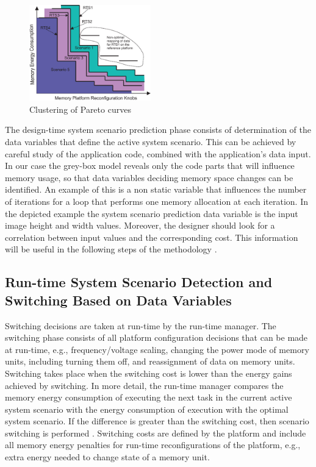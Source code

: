 \documentclass[a4paper,conference]{IEEEtran}
\begin{document}
\begin{figure}[!t]
\centering
\includegraphics[width=0.47\textwidth]{Images/2DClustering.eps}
\caption{Clustering of Pareto curves}
\label{fig:pareto}
\end{figure}

The design-time system scenario prediction phase consists of determination of the data variables that define the active system scenario. This can be achieved by careful study of the application code, combined with the application's data input. In our case the grey-box model reveals only the code parts that will influence memory usage, so that data variables deciding memory space changes can be identified. An example of this is a non static variable that influences the number of iterations for a loop that performs one memory allocation at each iteration. In the depicted example the system scenario prediction data variable is the input image height and width values. Moreover, the designer should look for a correlation between input values and the corresponding cost. This information will be useful in the following steps of the methodology \cite{tcm}.

\subsection{Run-time System Scenario Detection and Switching Based on Data Variables}

Switching decisions are taken at run-time by the run-time manager. The switching phase consists of all platform configuration decisions that can be made at run-time, e.g., frequency/voltage scaling, changing the power mode of memory units, including turning them off, and reassignment of data on memory units. Switching takes place when the switching cost is lower than the energy gains achieved by switching. In more detail, the run-time manager compares the memory energy consumption of executing the next task in the current active system scenario with the energy consumption of execution with the optimal system scenario. If the difference is greater than the switching cost, then scenario switching is performed \cite{tcm}. Switching costs are defined by the platform and include all memory energy penalties for run-time reconfigurations of the platform, e.g., extra energy needed to change state of a memory unit.
\end{document}
